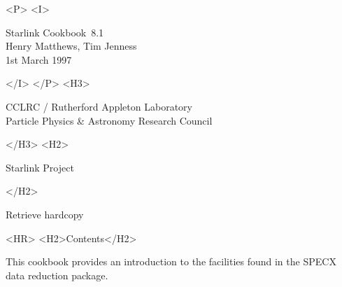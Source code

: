 \documentclass[11pt,twoside]{article}
\newcommand{\stardoccategory}  {Starlink Cookbook}
\newcommand{\stardocinitials}  {SC}
\newcommand{\stardocsource}    {sc\stardocnumber}
\newcommand{\stardocnumber}    {8.1}
\newcommand{\stardocauthors}   {Henry Matthews, Tim Jenness}
\newcommand{\stardocdate}      {1st March 1997}
\newcommand{\stardocabstract}  {%
This cookbook provides an introduction to the facilities
found in the SPECX data reduction package.

}
\newcommand{\stardocname}{\stardocinitials /\stardocnumber}
\newcommand{\htmladdnormallink}[2]{#1}
\newcommand{\htmladdimg}[1]{}
\newenvironment{latexonly}{}{}
\newcommand{\htmlref}[2]{#1}
\newcommand{\htmladdtonavigation}[1]{}
\newcommand{\xlabel}[1]{}
\newcommand{\latexonlytoc}[0]{\tableofcontents}
\renewcommand{\thepage}{\roman{page}}
\begin{document}
\begin{htmlonly}
   \begin{rawhtml} <P> <I> \end{rawhtml}
   \stardoccategory\ \stardocnumber \\
   \stardocauthors \\
   \stardocdate
   \begin{rawhtml} </I> </P> <H3> \end{rawhtml}
      \htmladdnormallink{CCLRC}{http://www.cclrc.ac.uk} /
      \htmladdnormallink{Rutherford Appleton Laboratory}
                        {http://www.cclrc.ac.uk/ral} \\
      \htmladdnormallink{Particle Physics \& Astronomy Research Council}
                        {http://www.pparc.ac.uk} \\
   \begin{rawhtml} </H3> <H2> \end{rawhtml}
      \htmladdnormallink{Starlink Project}{http://www.starlink.ac.uk/}
   \begin{rawhtml} </H2> \end{rawhtml}
   \htmladdnormallink{\htmladdimg{source.gif} Retrieve hardcopy}
      {http://www.starlink.ac.uk/cgi-bin/hcserver?\stardocsource}\\

  \label{stardoccontents}
  \begin{rawhtml}
    <HR>
    <H2>Contents</H2>
  \end{rawhtml}
  \renewcommand{\latexonlytoc}[0]{}
  \htmladdtonavigation{\htmlref{\htmladdimg{contents_motif.gif}}
        {stardoccontents}}

\end{htmlonly}

\stardocabstract


 \newpage
 \begin{latexonly}
   \setlength{\parskip}{0mm}
   \latexonlytoc
   \setlength{\parskip}{\medskipamount}
   \markboth{\stardocname}{\stardocname}
 \end{latexonly}
\cleardoublepage
\renewcommand{\thepage}{\arabic{page}}
\setcounter{page}{1}
\end{document}
